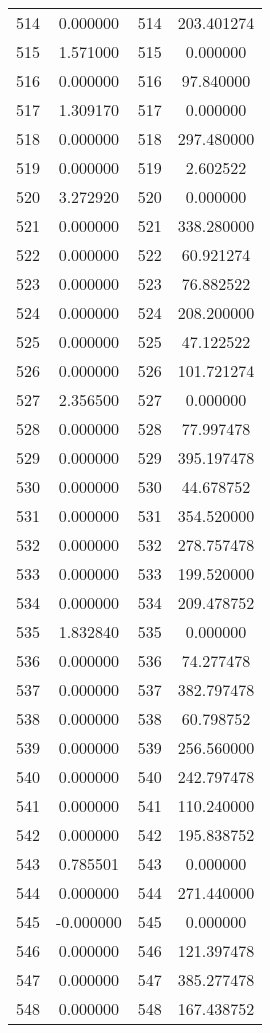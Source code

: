 \documentclass[12pt]{article}
\begin{document}
\begin{longtable}{@{}cccc@{}}
514 & 0.000000 & 514 & 203.401274 \\
515 & 1.571000 & 515 & 0.000000 \\
516 & 0.000000 & 516 & 97.840000 \\
517 & 1.309170 & 517 & 0.000000 \\
518 & 0.000000 & 518 & 297.480000 \\
519 & 0.000000 & 519 & 2.602522 \\
520 & 3.272920 & 520 & 0.000000 \\
521 & 0.000000 & 521 & 338.280000 \\
522 & 0.000000 & 522 & 60.921274 \\
523 & 0.000000 & 523 & 76.882522 \\
524 & 0.000000 & 524 & 208.200000 \\
525 & 0.000000 & 525 & 47.122522 \\
526 & 0.000000 & 526 & 101.721274 \\
527 & 2.356500 & 527 & 0.000000 \\
528 & 0.000000 & 528 & 77.997478 \\
529 & 0.000000 & 529 & 395.197478 \\
530 & 0.000000 & 530 & 44.678752 \\
531 & 0.000000 & 531 & 354.520000 \\
532 & 0.000000 & 532 & 278.757478 \\
533 & 0.000000 & 533 & 199.520000 \\
534 & 0.000000 & 534 & 209.478752 \\
535 & 1.832840 & 535 & 0.000000 \\
536 & 0.000000 & 536 & 74.277478 \\
537 & 0.000000 & 537 & 382.797478 \\
538 & 0.000000 & 538 & 60.798752 \\
539 & 0.000000 & 539 & 256.560000 \\
540 & 0.000000 & 540 & 242.797478 \\
541 & 0.000000 & 541 & 110.240000 \\
542 & 0.000000 & 542 & 195.838752 \\
543 & 0.785501 & 543 & 0.000000 \\
544 & 0.000000 & 544 & 271.440000 \\
545 & -0.000000 & 545 & 0.000000 \\
546 & 0.000000 & 546 & 121.397478 \\
547 & 0.000000 & 547 & 385.277478 \\
548 & 0.000000 & 548 & 167.438752 \\

\end{longtable}
\end{document}
